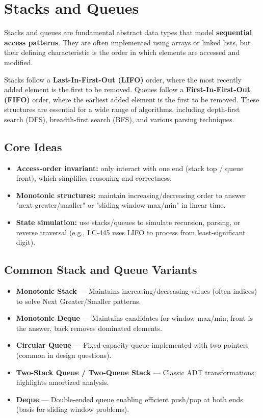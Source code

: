 \section{Stacks and Queues}
Stacks and queues are fundamental abstract data types that model \textbf{sequential access patterns}. They are often implemented using arrays or linked lists, but their defining characteristic is the order in which elements are accessed and modified.

Stacks follow a \textbf{Last-In-First-Out (LIFO)} order, where the most recently added element is the first to be removed. Queues follow a \textbf{First-In-First-Out (FIFO)} order, where the earliest added element is the first to be removed. These structures are essential for a wide range of algorithms, including depth-first search (DFS), breadth-first search (BFS), and various parsing techniques. 


\subsection{Core Ideas}
\begin{itemize}[nosep]
  \item \textbf{Access-order invariant:} only interact with one end (stack top / queue front), which simplifies reasoning and correctness.
  \item \textbf{Monotonic structures:} maintain increasing/decreasing order to answer "next greater/smaller" or "sliding window max/min" in linear time.
  \item \textbf{State simulation:} use stacks/queues to simulate recursion, parsing, or reverse traversal (e.g., LC-445 uses LIFO to process from least-significant digit).
\end{itemize}


\subsection{Common Stack and Queue Variants}
\begin{itemize}[nosep]
  \item \textbf{Monotonic Stack} — Maintains increasing/decreasing values (often indices) to solve Next Greater/Smaller patterns.
  \item \textbf{Monotonic Deque} — Maintains candidates for window max/min; front is the answer, back removes dominated elements.
  \item \textbf{Circular Queue} — Fixed-capacity queue implemented with two pointers (common in design questions).
  \item \textbf{Two-Stack Queue / Two-Queue Stack} — Classic ADT transformations; highlights amortized analysis.
  \item \textbf{Deque} — Double-ended queue enabling efficient push/pop at both ends (basis for sliding window problems).
\end{itemize}


